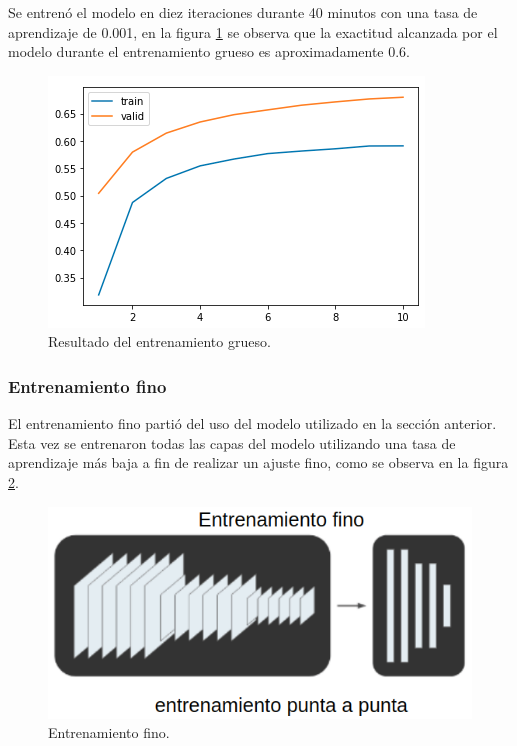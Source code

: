 Se entrenó el modelo en diez iteraciones durante 40 minutos con una tasa de aprendizaje de 0.001, en la figura \ref{fig:entrenamientoGruesoResultado} se observa que la exactitud alcanzada por el modelo durante el entrenamiento grueso es aproximadamente 0.6.

\begin{figure}[ht]
	\centering
	\includegraphics[scale=1.]{./Figures/entrenamientoGruesoResultado.png}
	\caption{Resultado del entrenamiento grueso.}
	\label{fig:entrenamientoGruesoResultado}
\end{figure}

\newpage

\subsubsection{Entrenamiento fino}

El entrenamiento fino partió del uso del modelo utilizado en la sección anterior. Esta vez se entrenaron todas las capas del modelo utilizando una tasa de aprendizaje más baja a fin de realizar un ajuste fino, como se observa en la figura \ref{fig:entrenamientoFino}.

\begin{figure}[ht]
	\centering
	\includegraphics[scale=.60]{./Figures/entrenamientoFino.png}
	\caption{Entrenamiento fino.}
	\label{fig:entrenamientoFino}
\end{figure}

